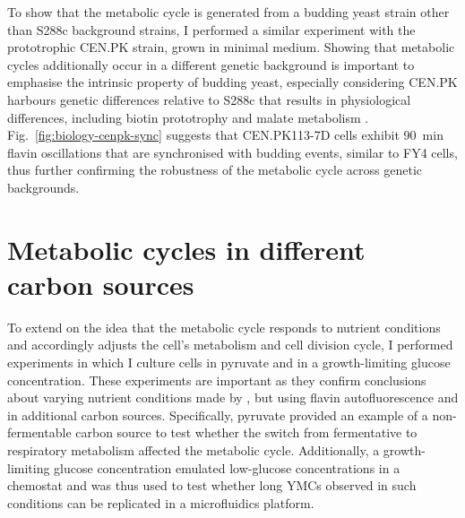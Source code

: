 To show that the metabolic cycle is generated from a budding yeast strain other than S288c background strains, I performed a similar experiment with the prototrophic CEN.PK strain, grown in minimal medium.
Showing that metabolic cycles additionally occur in a different genetic background is important to emphasise the intrinsic property of budding yeast, especially considering CEN.PK harbours genetic differences relative to S288c that results in physiological differences, including biotin prototrophy and malate metabolism \parencite{nijkampNovoSequencingAssembly2012}.
Fig.\ \ref{fig:biology-cenpk-sync} suggests that CEN.PK113-7D cells exhibit \SI{90}{\minute} flavin oscillations that are synchronised with budding events, similar to FY4 cells, thus further confirming the robustness of the metabolic cycle across genetic backgrounds.


\section{Metabolic cycles in different carbon sources}
\label{sec:biology-carbon}

To extend on the idea that the metabolic cycle responds to nutrient conditions and accordingly adjusts the cell's metabolism and cell division cycle, I performed experiments in which I culture cells in pyruvate and in a growth-limiting glucose concentration.
These experiments are important as they confirm conclusions about varying nutrient conditions made by \textcite{papagiannakisAutonomousMetabolicOscillations2017},
but using flavin autofluorescence and in additional carbon sources.
Specifically, pyruvate provided an example of a non-fermentable carbon source to test whether the switch from fermentative to respiratory metabolism affected the metabolic cycle.
Additionally, a growth-limiting glucose concentration emulated low-glucose concentrations in a chemostat and was thus used to test whether long YMCs observed in such conditions can be replicated in a microfluidics platform.

